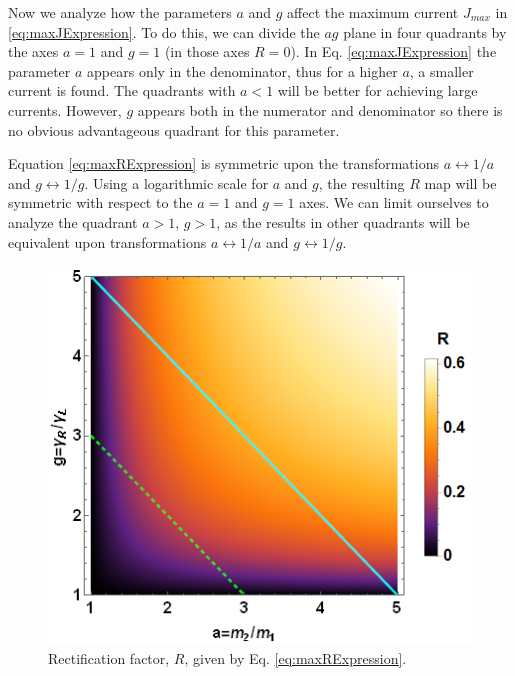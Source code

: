 %
Now we analyze how the parameters $a$ and $g$ affect the maximum current $J_{max}$ in \eqref{eq:maxJExpression}. To do this, we can divide the $ag$ plane in four quadrants by the axes $a = 1$ and $g = 1$ (in those axes $R = 0$). In Eq. \eqref{eq:maxJExpression} the parameter $a$ appears only in the denominator, thus for a higher $a$, a smaller current is found. The quadrants with $a < 1$ will be better for achieving large currents. However, $g$ appears both in the numerator and denominator so there is no obvious advantageous quadrant for this parameter.

Equation \eqref{eq:maxRExpression} is symmetric upon the transformations $a \leftrightarrow 1/a$ and $g \leftrightarrow 1/g$. Using a logarithmic scale for $a$ and $g$, the resulting $R$ map will be symmetric with respect to the $a=1$ and $g=1$ axes. We can limit ourselves to analyze the quadrant $a > 1$, $g > 1$, as the results in other quadrants will be equivalent upon transformations $a \leftrightarrow 1/a$ and $g \leftrightarrow 1/g$.


\begin{figure}
  \includegraphics[width=\linewidth]{Figures/Rade.png}
  \caption{Rectification factor, $R$, given by Eq. \eqref{eq:maxRExpression}.}
  \label{fig:R_g_a_plane}
\end{figure}

